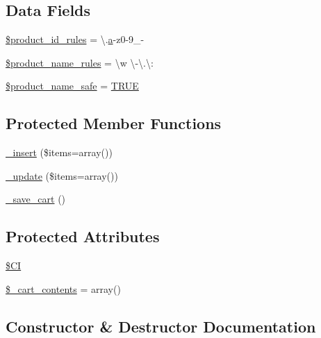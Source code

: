 \subsection*{Data Fields}
\begin{DoxyCompactItemize}
\item 
\mbox{\hyperlink{class_c_i___cart_aef9fb0bb2a9ab37008d77ed80b7b122b}{\$product\+\_\+id\+\_\+rules}} = \textquotesingle{}\textbackslash{}.\mbox{\hyperlink{interfacea}{a}}-\/z0-\/9\+\_\+-\/\textquotesingle{}
\item 
\mbox{\hyperlink{class_c_i___cart_afdc2e791be5e676e94580a0d9ed63ebf}{\$product\+\_\+name\+\_\+rules}} = \textquotesingle{}\textbackslash{}w \textbackslash{}-\/\textbackslash{}.\textbackslash{}\+:\textquotesingle{}
\item 
\mbox{\hyperlink{class_c_i___cart_afefced563284b97869b3d35053857362}{\$product\+\_\+name\+\_\+safe}} = \mbox{\hyperlink{constants_8php_ae04a3efe6aa42044f803ee90c2277846}{T\+R\+UE}}
\end{DoxyCompactItemize}
\subsection*{Protected Member Functions}
\begin{DoxyCompactItemize}
\item 
\mbox{\hyperlink{class_c_i___cart_a55d27979573b7d46bdf774f247c15b07}{\+\_\+insert}} (\$items=array())
\item 
\mbox{\hyperlink{class_c_i___cart_ac7b19afff2357d4b9e926ee2df1f3e65}{\+\_\+update}} (\$items=array())
\item 
\mbox{\hyperlink{class_c_i___cart_abaa559f3e9e7f8ad933f19165fb61083}{\+\_\+save\+\_\+cart}} ()
\end{DoxyCompactItemize}
\subsection*{Protected Attributes}
\begin{DoxyCompactItemize}
\item 
\mbox{\hyperlink{class_c_i___cart_ae0314d046ddf7fcfaec03222977427d3}{\$\+CI}}
\item 
\mbox{\hyperlink{class_c_i___cart_a93aff4174af6004d8cc7a51bf0c59632}{\$\+\_\+cart\+\_\+contents}} = array()
\end{DoxyCompactItemize}


\subsection{Constructor \& Destructor Documentation}
\mbox{\label{class_c_i___cart_a568ecdb0d73d2a870f33189739922a50}} 
